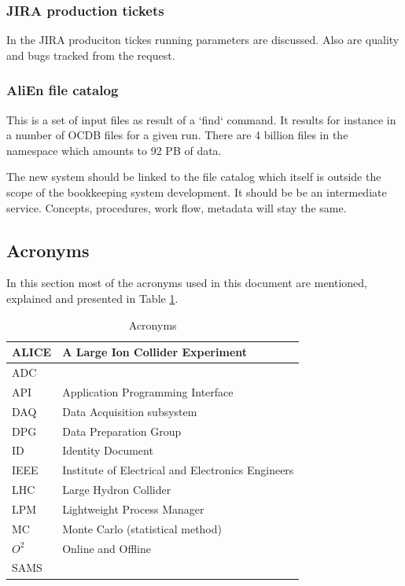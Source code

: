\subsubsection{JIRA production tickets}
In the JIRA produciton tickes running parameters are discussed. Also are quality and bugs tracked from the request.

\subsubsection{AliEn file catalog}
This is a set of input files as result of a `find` command. It results for instance in a number of OCDB files for a given run. There are 4 billion files in the namespace which amounts to 92 PB of data.

The new system should be linked to the file catalog which itself is outside the scope of the bookkeeping system development. It should be be an intermediate service. Concepts, procedures, work flow, metadata will stay the same.
 
\subsection{Acronyms} 
In this section most of the acronyms used in this document are mentioned, explained and presented in Table \ref{tab:acronyms}.
\begin{table}[h]
\begin{center}
\begin{longtable}{ll}
    \hline
    ALICE & A Large Ion Collider Experiment\\
    \hline
    ADC & \\
    \hline
    API & Application Programming Interface\\
    \hline
    DAQ & Data Acquisition subsystem \\
    \hline
    DPG & Data Preparation Group\\
    \hline
    ID & Identity Document\\
    \hline
    IEEE & Institute of Electrical and Electronics Engineers\\
    \hline
     LHC  & Large Hydron Collider\\
     \hline
     LPM & Lightweight Process Manager \\
     \hline
     MC & Monte Carlo (statistical method)\\
     \hline
     $O^2$ & Online and Offline\\
     \hline
     SAMS & \\
     \hline
    \end{longtable}
      \caption{Acronyms}
  \label{tab:acronyms}
  \end{center}
  
\end{table}

